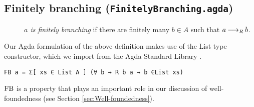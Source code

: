 \subsection{Finitely branching (\texttt{FinitelyBranching.agda})}

\begin{definition} \hfill
    \begin{description}
        \item[] \emph{$a$ is finitely branching} if there are finitely many $b \in A$ such that $a \mathbin{\longrightarrow_R} b$.
    \end{description}
\end{definition}

Our Agda formulation of the above definition makes use of the List type constructor, which we import from the Agda Standard Library \cite{AgdaLibraryList}. 


\verb|FB a = Σ[ xs ∈ List A ] (∀ b → R b a → b ∈List xs)|

$\mathrm{FB}$ is a property that plays an important role in our discussion of well-foundedness (see Section \ref{sec:Well-foundedness}).



